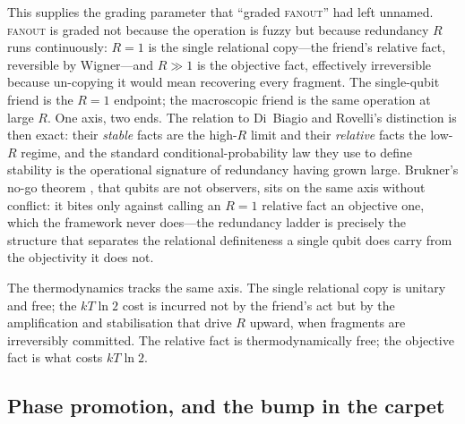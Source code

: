 This supplies the grading parameter that ``graded \textsc{fanout}'' had left
unnamed. \textsc{fanout} is graded not because the operation is fuzzy but because
redundancy $R$ runs continuously: $R=1$ is the single relational copy---the
friend's relative fact, reversible by Wigner---and $R\gg 1$ is the objective
fact, effectively irreversible because un-copying it would mean recovering every
fragment. The single-qubit friend is the $R=1$ endpoint; the macroscopic friend
is the same operation at large $R$. One axis, two ends. The relation to
Di~Biagio and Rovelli's distinction \autocite{DiBiagioRovelli2021} is then exact:
their \emph{stable} facts are the high-$R$ limit and their \emph{relative} facts
the low-$R$ regime, and the standard conditional-probability law they use to
define stability is the operational signature of redundancy having grown large.
Brukner's no-go theorem \autocite{Brukner2021}, that qubits are not observers,
sits on the same axis without conflict: it bites only against calling an $R=1$
relative fact an objective one, which the framework never does---the redundancy
ladder is precisely the structure that separates the relational definiteness a
single qubit does carry from the objectivity it does not.

The thermodynamics tracks the same axis. The single relational copy is unitary and
free; the $kT\ln 2$ cost \autocite{Landauer_1961} is incurred not by the friend's
act but by the amplification and stabilisation that drive $R$ upward, when
fragments are irreversibly committed. The relative fact is thermodynamically free;
the objective fact is what costs $kT\ln 2$.

\subsection{Phase promotion, and the bump in the carpet}
\label{sec:wf-phase-promotion}

